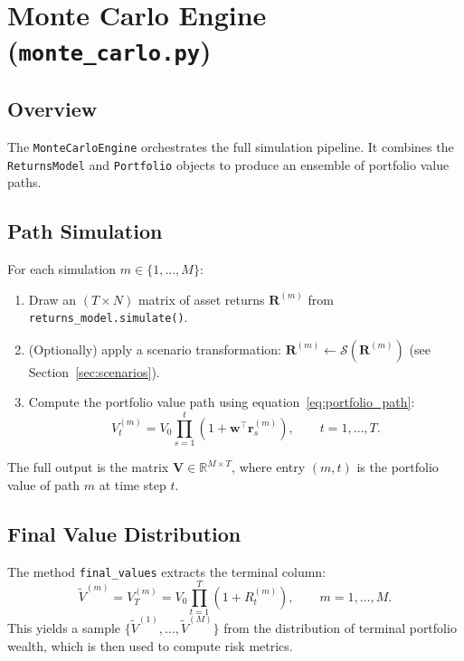\documentclass[12pt, a4paper]{article}
\begin{document}
\section{Monte Carlo Engine (\texttt{monte\_carlo.py})}

\subsection{Overview}

The \texttt{MonteCarloEngine} orchestrates the full simulation pipeline. It
combines the \texttt{ReturnsModel} and \texttt{Portfolio} objects to produce an
ensemble of portfolio value paths.

\subsection{Path Simulation}

For each simulation $m \in \{1, \ldots, M\}$:
\begin{enumerate}
    \item Draw an $(T \times N)$ matrix of asset returns
          $\mathbf{R}^{(m)}$ from \texttt{returns\_model.simulate()}.
    \item (Optionally) apply a scenario transformation: $\mathbf{R}^{(m)}
          \leftarrow \mathcal{S}(\mathbf{R}^{(m)})$ (see Section~\ref{sec:scenarios}).
    \item Compute the portfolio value path using equation~\eqref{eq:portfolio_path}:
          \[
            V^{(m)}_t = V_0 \prod_{s=1}^{t}(1 + \bm{w}^\top\bm{r}^{(m)}_s),
            \qquad t = 1,\ldots,T.
          \]
\end{enumerate}

The full output is the matrix $\mathbf{V} \in \mathbb{R}^{M \times T}$, where
entry $(m, t)$ is the portfolio value of path $m$ at time step $t$.

\subsection{Final Value Distribution}

The method \texttt{final\_values} extracts the terminal column:
\begin{equation}
    \boxed{\widetilde{V}^{(m)} = V^{(m)}_T = V_0 \prod_{t=1}^{T}(1 + R^{(m)}_t),
    \qquad m = 1,\ldots,M.}
\end{equation}
This yields a sample $\{\widetilde{V}^{(1)}, \ldots, \widetilde{V}^{(M)}\}$
from the distribution of terminal portfolio wealth, which is then used to
compute risk metrics.
\end{document}
